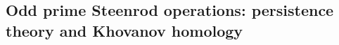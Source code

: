 %
%
%
%
%

\subsection{Odd prime Steenrod operations: persistence theory and Khovanov homology} \label{ss:odd prime steenrod operations}

